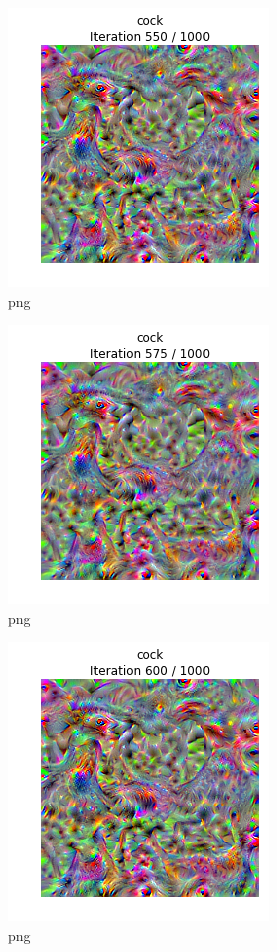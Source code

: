 \documentclass[]{book}
\theoremstyle{definition}
\theoremstyle{definition}
\theoremstyle{definition}
\theoremstyle{remark}
\begin{document}
\begin{figure}
\centering
\includegraphics{Network-Visualization-TensorFlow_files/Network-Visualization-TensorFlow_22_22.png}
\caption{png}
\end{figure}

\begin{figure}
\centering
\includegraphics{Network-Visualization-TensorFlow_files/Network-Visualization-TensorFlow_22_23.png}
\caption{png}
\end{figure}

\begin{figure}
\centering
\includegraphics{Network-Visualization-TensorFlow_files/Network-Visualization-TensorFlow_22_24.png}
\caption{png}
\end{figure}
\end{document}
